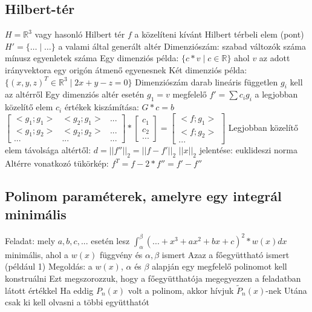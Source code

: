 \documentclass[12pt,a4paper]{article}
\begin{document}
\pagebreak

\subsection{Hilbert-tér}

\begin{outline}
	\1 $H = \mathbb{R}^3$ vagy hasonló Hilbert tér
	\1 $f$ a közelíteni kívánt Hilbert térbeli elem (pont)
	\1 $H' = \{ \dots \;|\; \dots \}$ a valami által generált altér
		\2 Dimenziószám: szabad változók száma mínusz egyenletek száma
			\3 Egy dimenziós példa: $\{ c * v \;|\; c \in \mathbb{R} \}$ ahol $v$ az adott irányvektora egy origón átmenő egyenesnek
			\3 Két dimenziós példa: $\{(x,y,z)^T \in \mathbb{R}^3 \;|\; 2x+y-z=0 \}$
		\2 Dimenziószám darab lineáris független $g_i$ kell az altérről
			\3 Egy dimenziós altér esetén $g_1=v$ megfelelő
	\1 $f' = \sum c_i g_i$ a legjobban közelítő elem
		\2 $c_i$ értékek kiszámítása: $G*c=b$\\
		$\begin{bmatrix}
			<g_1;g_1> & <g_2;g_1> & ... \\
			<g_1;g_2> & <g_2;g_2> & ... \\
			... & ... & ...
		\end{bmatrix} * \begin{bmatrix}
			c_1 \\ c_2 \\ ...
		\end{bmatrix} = \begin{bmatrix}
			<f;g_1> \\ <f;g_2> \\ ...
		\end{bmatrix}$
	\1 Legjobban közelítő elem távolsága altértől: $d = ||f''||_2 = ||f-f'||_2$
		\2 $||x||_2$ jelentése: euklideszi norma
	\1 Altérre vonatkozó tükörkép: $f^T = f - 2*f'' = f' - f''$
\end{outline}

\pagebreak

\subsection{Polinom paraméterek, amelyre egy integrál minimális}

\begin{outline}
	\1 Feladat: mely $a,b,c,...$ esetén lesz $\int_{\alpha}^{\beta} (... + x^3 + ax^2 + bx + c)^2 * w(x) dx$ minimális, ahol a $w(x)$ függvény és $\alpha,\beta$ ismert
		\2 Azaz a főegyüttható ismert (például 1)
	\1 Megoldás: a $w(x)$, $\alpha$ és $\beta$ alapján egy megfelelő polinomot kell konstruálni
		\2 Ezt megszorozzuk, hogy a főegyütthatója megegyezzen a feladatban látott értékkel
			\3 Ha eddig $P_n(x)$ volt a polinom, akkor hívjuk $\widetilde{P}_n(x)$-nek
		\2 Utána csak ki kell olvasni a többi együtthatót
\end{outline}
\end{document}
